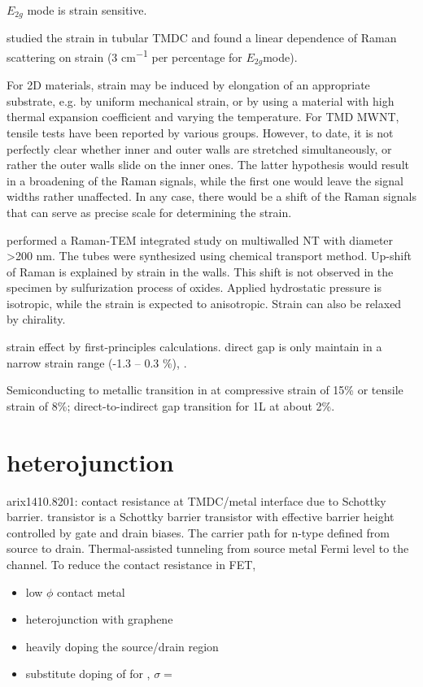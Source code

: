 $E_{2g}$ mode is strain sensitive. 

\citeauthor{Ghorbani-Asl2013} studied the strain in tubular TMDC and found a linear dependence of Raman scattering on strain (3 \si{cm^{-1}} per percentage for $E_{2g}$mode).\cite{Ghorbani-Asl2013} 

For 2D materials, strain may be induced by elongation of an appropriate substrate, e.g. by uniform mechanical strain, or by using a material with high thermal expansion coefficient and varying the temperature. For TMD MWNT, tensile tests have been reported by various groups. However, to date, it is not perfectly clear whether inner and outer walls are stretched simultaneously, or rather the outer walls slide on the inner ones. The latter hypothesis would result in a broadening of the Raman signals, while the first one would leave the signal widths rather unaffected. In any case, there would be a shift of the Raman signals that can serve as precise scale for determining the strain.\cite{Ghorbani-Asl2013}


\citeauthor{Virsek2007} performed a Raman-TEM integrated study on multiwalled  NT with diameter \textgreater 200 nm. The tubes were synthesized using chemical transport method. Up-shift of Raman is explained by strain in the walls. This shift is not observed in the specimen by sulfurization process of oxides. Applied hydrostatic pressure is isotropic,\cite{Staiger2012} while the strain is expected to anisotropic. Strain can also be relaxed by chirality.\cite{Virsek2007} 

strain effect by first-principles calculations. direct gap is only maintain in a narrow strain range (-1.3 -- 0.3 \%), \cite{Yun2012}.

Semiconducting to metallic transition in  at compressive strain of 15\% or tensile strain of 8\%; direct-to-indirect gap transition for 1L  at about 2\%. \cite{Scalise2012}

\section{heterojunction}

arix1410.8201: contact resistance at TMDC/metal interface due to Schottky barrier.  transistor is a Schottky barrier transistor with effective barrier height controlled by gate and drain biases. The carrier path for n-type  defined from source to drain. Thermal-assisted tunneling from source metal Fermi level to the channel. To reduce the contact resistance in  FET, 
\begin{itemize}
\item low $\phi$ contact metal
\item heterojunction with graphene 
\item heavily doping the source/drain region
\item substitute doping of  for , $\sigma = $
\end{itemize}

